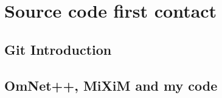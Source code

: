 \appendix
\chapter{Source code first contact}

\section{Git Introduction}

\section{OmNet++, \ac{MiXiM} and my code}
